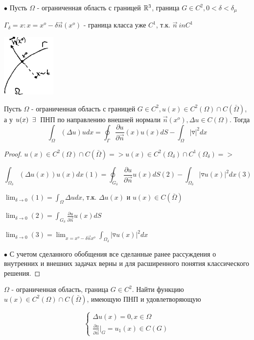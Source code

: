 $\bullet$ Пусть $\Omega$ - ограниченная область с границей $\mathbb{R}^3$, граница $G \in C^2, 0 < \delta < \delta_{\mu}$

$\Gamma_{\delta} = {x: x = x^o - \delta \vec{n}(x^o)}$ - граница класса уже $C^1$, т.к. $\vec{n} \ in C^1$
\begin{center}
\includegraphics[width=0.2\textwidth]{31_2_new}
\end{center}
\begin{lemma}
Пусть $\Omega$ - ограниченная область с границей $G \in C^2, u(x) \in C^2(\Omega) \cap C(\bar{\Omega})$, а у $u(x) \;\;\exists\: $ ПНП по направлению внешней нормали $\vec{n}(x^o), \Delta u \in C(\Omega)$. Тогда $$\int_{\Omega} (\Delta u)udx = \oint_{\Gamma} \frac{\partial u}{\partial \vec{n}}(x) u(x)dS - \int_{\Omega} |\triangledown|^2 dx $$
\end{lemma}
\begin{proof}
$u(x) \in C^2(\Omega) \cap C(\bar{\Omega}) => u(x) \in C^2(\Omega_{\delta}) \cap C^1(\Omega_{\delta}) => $

$$\int_{\Omega_{\delta}}(\Delta u(x))u(x)dx (1) = \oint_{G_{\delta}} \frac{\partial u}{\partial \vec{n}}u(x)dS (2) - \int_{\Omega_{\delta}}|\triangledown u(x)|^2dx (3)$$

$\lim_{\delta \to 0}(1) = \int_{\Omega} \Delta udx$, т.к. $\Delta u(x)$ и $u(x) \in C(\bar{\Omega})$

$\lim_{\delta \to 0}(2) = \int_{G_{\delta}} \frac{\partial u}{\partial \vec{n}}u(x)dS $

$\lim_{\delta \to 0}(3) = \lim_{x = x^o - \delta \vec{n}x^o} \int_{\Omega_{\delta}} |\triangledown u(x)|^2dx$

$\bullet$ С учетом сделанного обобщения все сделанные ранее рассуждения о внутренних и внешних задачах верны и для расширенного понятия классического решения.
\end{proof}
\begin{theorem}
$\Omega$ - ограниченная область, граница $G \in C^2$. Найти функцию $u(x) \in C^2(\Omega) \cap C(\bar{\Omega})$, имеющую ПНП и удовлетворяющую 

\begin{equation}
\begin{cases}
\Delta u(x) = 0, x \in \Omega
\\
\frac{\partial u}{\partial \vec{n}}|_G = u_1(x) \in C(G)
\end{cases}
\end{equation}
\end{theorem}
